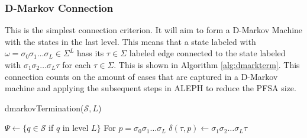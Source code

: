 {\subsubsection{D-Markov Connection}

This is the simplest connection criterion. It will aim to form a D-Markov Machine with the states in the last level. This means that a state labeled with $\omega = \sigma_0\sigma_1\ldots\sigma_L \in \Sigma^L$ hass its $\tau \in \Sigma$ labeled edge connected to the state labeled with $\sigma_1\sigma_2\ldots\sigma_L\tau$ for each $\tau \in \Sigma$. This is shown in Algorithm \ref{alg:dmarkterm}. This connection counts on the amount of cases that are captured in a D-Markov machine and applying the subsequent steps in ALEPH to reduce the PFSA size. 

  \begin{algorithm}
  \caption{dmarkovTermination($\mathcal{S}, L$)\label{alg:dmarkterm}}
    \begin{algorithmic}[1]
      	\State $\Psi \gets \{q \in \mathcal{S}$ if $q$ in level $L\}$
      		\State For $p = \sigma_0\sigma_1\ldots\sigma_L$
      		\For{$\tau \in \Sigma$}
      			\State $\delta(\tau, p) \gets \sigma_1\sigma_2\ldots\sigma_L\tau$
      		\EndFor
      	\EndFor
      \EndProcedure
    \end{algorithmic}
  \end{algorithm}
  
}
